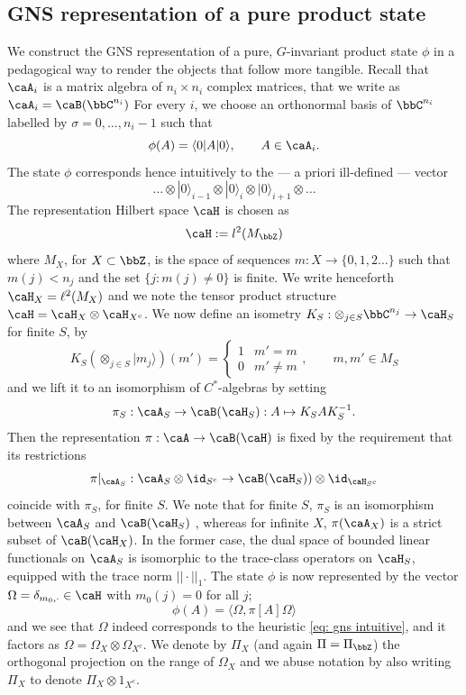 \subsection{GNS representation of a pure product state}\label{sec:GNS of product state}
We construct the GNS representation of a pure, $G$-invariant product state $\phi$ in a pedagogical way to render the objects that follow more tangible.
Recall that $\caA_i$ is a matrix algebra of $n_i\times n_i$ complex matrices, that we write as $\caA_i= \caB(\bbC^{n_i})$ For every $i$, we choose an orthonormal basis of $\bbC^{n_i}$ labelled by $\sigma=0,\ldots, n_i-1$ such that 
$$
\phi(A)=\langle 0|  A | 0\rangle,\qquad A\in \caA_i.
$$
The state $\phi$ corresponds hence intuitively to the --- a priori ill-defined --- vector 
\begin{equation}\label{eq: gns intuitive}
	\ldots \otimes | 0\rangle_{i-1} \otimes | 0\rangle_i \otimes | 0\rangle_{i+1} \otimes \ldots
\end{equation}
The representation Hilbert space $\caH$ is chosen as 
$$
\caH := l^2(M_\bbZ)
$$
where $M_X$, for $X\subset\bbZ$, is the space of sequences $m:X\to \{0,1,2\ldots\}$ such that $m(j) < n_j$ and the set $\{j: m(j)\neq 0\}$ is finite. We write henceforth $\caH_X=\ell^2(M_X)$  and we note the tensor product structure $\caH=\caH_X \otimes \caH_{X^c}$.
We now define an isometry $K_S: \otimes_{j\in S}\bbC^{n_j}\to\caH_S$ for finite $S$, by 
$$
K_S(\otimes_{j\in S}|m_j\rangle)(m')=\begin{cases}  1 &  m'=m \\
	0 &   m'\neq m
\end{cases},\qquad   m,m'\in M_S
$$
and we lift it to an isomorphism of $C^*$-algebras by setting
$$
\pi_S: \caA_S \to \caB(\caH_S):  A \mapsto K_SA K_S^{-1}.
$$
Then the representation $\pi:\caA\to\caB(\caH)$ is fixed by the requirement that its restrictions 
$$
\pi|_{\caA_S}:  \caA_S \otimes \id_{S^c} \to   \caB(\caH_S))\otimes \id_{\caH_{S^c}}
$$
coincide with $\pi_S$, for finite $S$.  We note that for finite $S$, $\pi_S$ is an isomorphism between $\caA_S$ and $\caB(\caH_S)$ , whereas for infinite $X$,  $\pi(\caA_X)$ is a strict subset of $\caB(\caH_X)$. In the former case, the dual space of bounded linear functionals on $\caA_S$ is isomorphic to the trace-class operators on $\caH_S$, equipped with the trace norm $||\cdot||_1$.
%
%
The state $\phi$ is now represented by the vector $\Omega=\delta_{m_0,\cdot}\in\caH$ with $m_0(j)=0$ for all $j$; 
$$
\phi(A)=\langle\Omega, \pi[A]\Omega\rangle
$$
and we see that $\Omega$ indeed corresponds to the heuristic \eqref{eq: gns intuitive}, and it factors as $\Omega=\Omega_X\otimes\Omega_{X^c}$.  We denote by $\Pi_X$ (and again $\Pi = \Pi_\bbZ$) the orthogonal projection on the range of $\Omega_X$ and we abuse notation by also writing $\Pi_X$ to denote $\Pi_X\otimes 1_{X^c}$.




